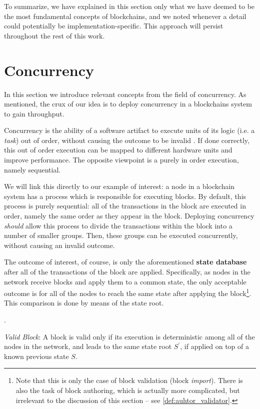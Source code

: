 To summarize, we have explained in this section only what we have deemed to be the most fundamental
concepts of blockchains, and we noted whenever a detail could potentially be implementation-specific. This approach will persist throughout the rest of this work.

\section{Concurrency} \label{chap_bg:sec:concurrency}

In this section we introduce relevant concepts from the field of concurrency. As mentioned, the
crux of our idea is to deploy concurrency in a blockchains system to gain throughput.

Concurrency is the ability of a software artifact to execute units of its logic (i.e. a
\textit{task}) out of order, without causing the outcome to be invalid
\cite{lamportTimeClocksOrdering1978}. If done correctly, this out of order execution can be mapped
to different hardware units and improve performance. The opposite viewpoint is a purely in order
execution, namely sequential.

We will link this directly to our example of interest: a node in a blockchain system has a process
which is responsible for executing blocks. By default, this process is purely sequential: all of the
transactions in the block are executed in order, namely the same order as they appear in the block.
Deploying concurrency \textit{should} allow this process to divide the transactions within the block
into a number of smaller groups. Then, these groups can be executed concurrently, without causing an
invalid outcome.

The outcome of interest, of course, is only the aforementioned \textbf{state database} after all of
the transactions of the block are applied. Specifically, as nodes in the network receive blocks and
apply them to a common state, the only acceptable outcome is for all of the nodes to reach the same
state after applying the block\footnote{Note that this is only the case of block validation (block
\textit{import}). There is also the task of block authoring, which is actually more complicated, but
irrelevant to the discussion of this section -- see \ref{def:auhtor_validator}.}. This comparison is
done by means of the state root.

.

\begin{definition} \label{def:valid_block}
	\textit{Valid Block}:
	A block is valid only if its execution is deterministic among all of the nodes in the network,
	and leads to the same state root $S^{'}$, if applied on top of a known previous state $S$.
\end{definition}

